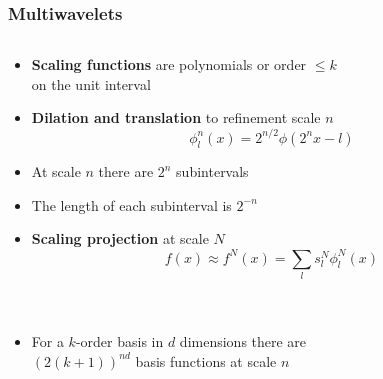 

\begin{frame}
\frametitle{Multiwavelets}
\begin{columns}

\begin{column}[b]{0.55\linewidth}
\begin{itemize}
    \item   \textbf{Scaling functions} are polynomials or order $\leq k$\\
	    on the unit interval
    \item   \textbf{Dilation and translation} to refinement scale $n$
	    \begin{equation}
		\nonumber
		\phi_l^n(x) = 2^{n/2}\phi(2^nx-l)
	    \end{equation}
    \item   At scale $n$ there are $2^n$ subintervals
    \item   The length of each subinterval is $2^{-n}$
    \item   \textbf{Scaling projection} at scale $N$
	    \begin{equation}
		\nonumber
		f(x) \approx f^N(x) = \sum_l s_l^N \phi_l^N(x)
	    \end{equation}
	    \ \\
	    \ \\
    \item   For a $k$-order basis in $d$ dimensions there are\\
	    $\left(2(k+1)\right)^{nd}$ basis functions at scale $n$\\
\end{itemize}
\centering

\end{column}
\end{columns}
\end{frame}
